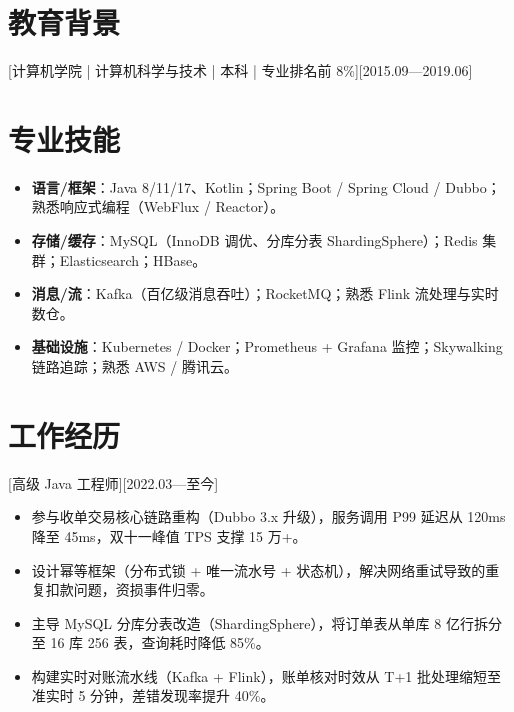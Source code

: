 \documentclass{resume-photo}
\begin{document}

\ResumeTitle


\section{教育背景}
[\textnormal{计算机学院 | 计算机科学与技术 | 本科 | 专业排名前 8\%}][2015.09—2019.06]

\section{专业技能}
\begin{itemize}
  \item \textbf{语言/框架}：Java 8/11/17、Kotlin；Spring Boot / Spring Cloud / Dubbo；熟悉响应式编程（WebFlux / Reactor）。
  \item \textbf{存储/缓存}：MySQL（InnoDB 调优、分库分表 ShardingSphere）；Redis 集群；Elasticsearch；HBase。
  \item \textbf{消息/流}：Kafka（百亿级消息吞吐）；RocketMQ；熟悉 Flink 流处理与实时数仓。
  \item \textbf{基础设施}：Kubernetes / Docker；Prometheus + Grafana 监控；Skywalking 链路追踪；熟悉 AWS / 腾讯云。
\end{itemize}

\section{工作经历}

[\textnormal{高级 Java 工程师}][2022.03—至今]
\begin{itemize}
  \item 参与收单交易核心链路重构（Dubbo 3.x 升级），服务调用 P99 延迟从 120ms 降至 45ms，双十一峰值 TPS 支撑 15 万+。
  \item 设计幂等框架（分布式锁 + 唯一流水号 + 状态机），解决网络重试导致的重复扣款问题，资损事件归零。
  \item 主导 MySQL 分库分表改造（ShardingSphere），将订单表从单库 8 亿行拆分至 16 库 256 表，查询耗时降低 85\%。
  \item 构建实时对账流水线（Kafka + Flink），账单核对时效从 T+1 批处理缩短至准实时 5 分钟，差错发现率提升 40\%。
\end{itemize}
\end{document}

